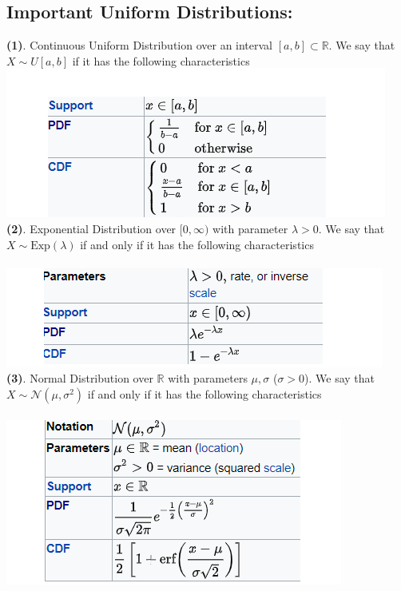 \documentclass[../main.tex]{subfiles}
\begin{document}
\subsection{Important Uniform Distributions:}
\textbf{(1)}. Continuous Uniform Distribution over an interval $[a,b]\subset\mathbb{R}$. We say that $X\sim U[a,b]$ if it has the following characteristics \\
\includegraphics{images/Stat_Theory_First_Image.png}
\\
\textbf{(2)}. Exponential Distribution over $[0,\infty)$ with parameter $\lambda>0$. We say that $X\sim \text{Exp}(\lambda)$ if and only if it has the following characteristics \\\\
\includegraphics{images/Stat_Theory_Second_Image.png}
\\
\textbf{(3)}. Normal Distribution over $\mathbb{R}$ with parameters $\mu,\sigma$ ($\sigma>0$). We say that $X\sim \mathcal{N}(\mu,\sigma^2)$ if and only if it has the following characteristics \\\\
\includegraphics{images/Stat_Theory_Third_Picture.png}
\\
\newpage
\end{document}
